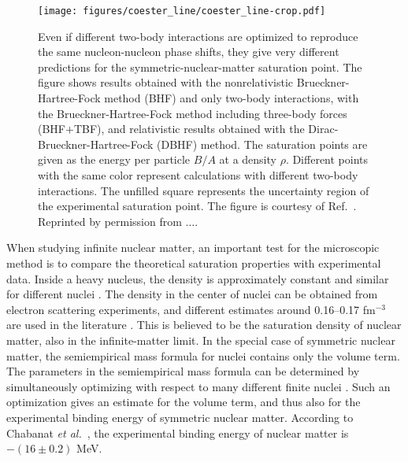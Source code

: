 \documentclass[a4paper,12pt]{report}
\begin{document}
\begin{figure} 
  \centering
  \texttt{[image: figures/coester\_line/coester\_line-crop.pdf]}
  \caption{Even if different two-body interactions are 
    optimized to reproduce the same nucleon-nucleon
    phase shifts, they give very different predictions for
    the symmetric-nuclear-matter saturation point. 
    The figure shows results \cite{li2006} 
    obtained with
    the nonrelativistic Brueckner-Hartree-Fock method (BHF)
    and only two-body interactions, with the 
    Brueckner-Hartree-Fock method including
    three-body forces (BHF$+$TBF), and relativistic 
    results obtained with the Dirac-Brueckner-Hartree-Fock
    (DBHF) method.  The saturation
    points are given as the energy per particle $B/A$ at a 
    density $\rho $. Different points with the same color
    represent calculations with different two-body 
    interactions. The unfilled square represents the
    uncertainty region of the experimental saturation point.
    The figure is courtesy of Ref.~\cite{li2006}. Reprinted 
    by permission from $\dots $.
  }
  \label{fig:coester}
\end{figure}


When studying infinite nuclear matter, an important
test for the microscopic method is to compare the theoretical
saturation properties with experimental data. Inside a heavy 
nucleus, the density is approximately constant 
and similar for different nuclei \cite{walecka2004}. 
The density in the center of nuclei can be obtained from 
electron scattering experiments, and different estimates 
around 0.16--0.17 fm$^{-3}$ are used in the literature 
\cite{chabanat1997,mahaux1989b}. This is believed to be
the saturation density of nuclear matter, also in the
infinite-matter limit. In the special case of symmetric
nuclear matter, the semiempirical mass formula 
\cite{walecka2004} for nuclei contains only the volume 
term. The parameters in the semiempirical mass formula
can be determined by simultaneously optimizing with 
respect to many different finite nuclei \cite{chabanat1997}.   
Such an optimization gives an estimate for the volume
term, and thus also for the experimental binding
energy of symmetric nuclear matter. According to
Chabanat \emph{et al.}~\cite{chabanat1997}, the 
experimental binding energy of nuclear matter is 
$-(16\pm 0.2)$ MeV. 
\end{document}
